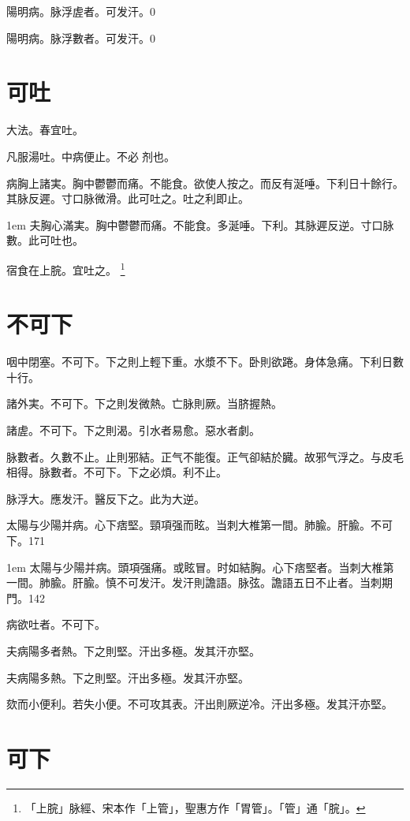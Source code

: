陽明病。脉浮虗者。可发汗。{\yifang}0

陽明病。脉浮數者。可发汗。{\gaoben}0

\section{可吐}

大法。春宜吐。

凡服湯吐。中病便止。不必{\sungtpii 𥁞}剂也。

病胸上諸実。胸中鬱鬱而痛。不能食。欲使人按之。而反有涎唾。下利日十餘行。其脉反遲。寸口{\khaaitp 脉}微滑。此可吐之。吐之利即止。

\hangindent 1em
夫胸心滿実。胸中鬱鬱而痛。不能食。多涎唾。下利。其脉遲反逆。寸口脉數。此可吐也。{\gaoben}

宿食在上脘。宜吐之。
	\footnote{
		「上脘」脉經、宋本作「上管」，聖惠方作「胃管」。「管」通「脘」。
	}

\section{不可下}

咽中閉塞。不可下。下之則上輕下重。水漿不下。卧則欲踡。身体急痛。下利日數十行。

諸外実。不可下。下之則发微熱。亡脉則厥。当脐握熱。

諸虗。不可下。下之則渴。引水者易愈。惡水者劇。

脉數者。久數不止。止則邪結。正气不能復。正气卻結於臓。故邪气浮之。与皮毛相得。脉數者。不可下。下之必煩。利不止。

脉浮大。應发汗。醫反下之。此为大逆。

太陽与少陽并病。心下痞堅。頸項强而眩。{\khaaitp 当刺大椎第一間。肺腧。肝腧。}不可下。171

\hangindent 1em
太陽与少陽并病。頭項强痛。或眩冒。时如結胸。心下痞堅者。当刺大椎第一間。肺腧。肝腧。慎不可发汗。发汗則譫語。脉弦。譫語五日不止者。当刺期門。142

病欲吐者。不可下。

夫病陽多者熱。下之則堅。汗出多極。发其汗亦堅。

夫病陽多熱。下之則堅。汗出多極。发其汗亦堅。{\yuhan}

欬而小便利。若失小便。不可攻其表。汗出則厥逆冷。汗出多極。发其汗亦堅。{\maijing}

\section{可下}

